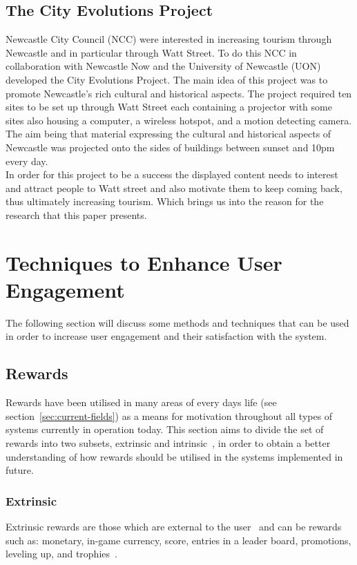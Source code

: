\documentclass[a4paper,12pt]{article}
\begin{document}
\subsection{The City Evolutions Project}\label{sec:city-evolutions-project}
Newcastle City Council (NCC) were interested in increasing tourism through Newcastle and in particular through Watt Street. To do this NCC in collaboration with Newcastle Now and the University of Newcastle (UON) developed the City Evolutions Project. 
The main idea of this project was to promote Newcastle's rich cultural and historical aspects. 
The project required ten sites to be set up through Watt Street each containing a projector with some sites also housing a computer, a wireless hotspot, and a motion detecting camera. The aim being that material expressing the cultural and historical aspects of Newcastle was projected onto the sides of buildings between sunset and 10pm every day.\\
In order for this project to be a success the displayed content needs to interest and attract people to Watt street and also motivate them to keep coming back, thus ultimately increasing tourism. Which brings us into the reason for the research that this paper presents.


\section{Techniques to Enhance User Engagement}\label{sec:techniques-to-enhance}
The following section will discuss some methods and techniques that can be used in order to increase user engagement and their satisfaction with the system.

\subsection{Rewards}\label{sec:rewards}
Rewards have been utilised in many areas of every days life (see section~\ref{sec:current-fields}) as a means for motivation throughout all types of systems currently in operation today.
This section aims to divide the set of rewards into two subsets, extrinsic and intrinsic~\citep{bread-and-games,fun-of-use,deci_extrinsic_2001,McGonigal:2011:RBW:1972527}, in order to obtain a better understanding of how rewards should be utilised in the systems implemented in future.

\subsubsection{Extrinsic}\label{sec:extrinsic}
Extrinsic rewards are those which are external to the user~\citep{deci_extrinsic_2001,McGonigal:2011:RBW:1972527} and can be rewards such as: monetary,	in-game currency, score, entries in a leader board, promotions, leveling up, and trophies~\citep{bread-and-games}.
\end{document}
